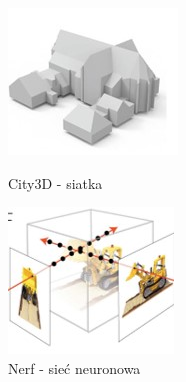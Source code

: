 \begin{figure}[!htb]
      \includegraphics[width=\linewidth]{img/sota/city3dmesh.jpg}
      \caption{City3D - siatka}\label{fig:mesh_example}
    \endminipage\hfill
      \includegraphics[width=\linewidth]{img/sota/nerfobject.jpg}
      \caption{Nerf - sieć neuronowa}\label{fig:nerf_example}
    \endminipage\hfill

\end{figure}
